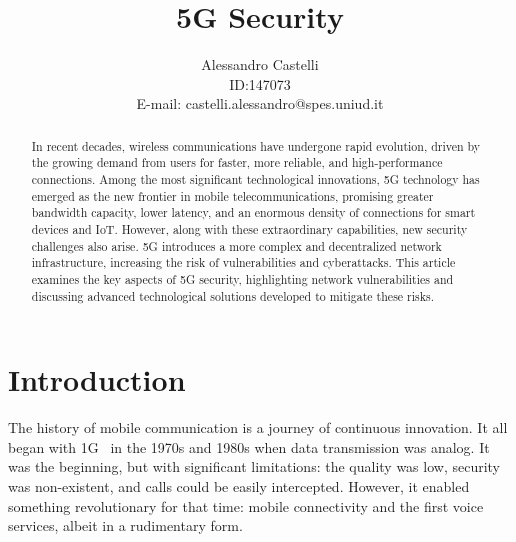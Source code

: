 \documentclass[english]{article}
\title{5G Security}
\author{Alessandro Castelli \\ ID:\@147073 \\ E-mail: castelli.alessandro@spes.uniud.it}
\begin{document}
\maketitle

\begin{abstract}
	In recent decades, wireless communications have undergone rapid evolution,
	driven by the growing demand from users for faster, more reliable, and
	high-performance connections. Among the most significant technological
	innovations, 5G technology has emerged as the new frontier in mobile
	telecommunications, promising greater bandwidth capacity, lower latency,
	and an enormous density of connections for smart devices and IoT. However,
	along with these extraordinary capabilities, new security challenges also
	arise. 5G introduces a more complex and decentralized network infrastructure,
	increasing the risk of vulnerabilities and cyberattacks. This article examines
	the key aspects of 5G security, highlighting network vulnerabilities and
	discussing advanced technological solutions developed to mitigate these risks.
\end{abstract}

\clearpage

\tableofcontents
\newpage
\section{Introduction}
The history of mobile communication is a journey of continuous innovation. It
all began with 1G~\cite{dangi2021study} in the 1970s and 1980s when data
transmission was analog. It was the beginning, but with significant
limitations: the quality was low, security was non-existent, and calls could be
easily intercepted. However, it enabled something revolutionary for that time:
mobile connectivity and the first voice services, albeit in a rudimentary form.
\end{document}
